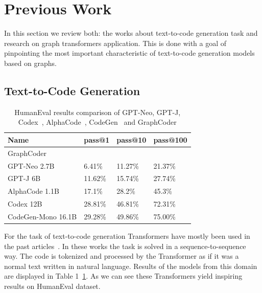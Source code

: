\documentclass[sigplan,screen,anonymous,natbib=false]{acmart}
\begin{document}
\section{Previous Work}\label{sec:previous-work}

In this section we review both: the works about text-to-code generation task and research on graph transformers application. 
This is done with a goal of pinpointing the most important characteristic of text-to-code generation models based on graphs.

\subsection{Text-to-Code Generation}\label{subsec:text-to-code-generation}

\begin{table}
    \centering
    \begin{tabular}{llll}
        \toprule
        \textbf{Name} & \textbf{pass@1} & \textbf{pass@10} & \textbf{pass@100} \\
        \midrule
        GraphCoder &  &  &  \\
        GPT-Neo 2.7B & 6.41\% & 11.27\% & 21.37\% \\
        GPT-J 6B & 11.62\% & 15.74\% & 27.74\% \\
        AlphaCode 1.1B & 17.1\% & 28.2\% & 45.3\% \\
        Codex 12B & 28.81\% & 46.81\% & 72.31\% \\
        CodeGen-Mono 16.1B & 29.28\% & 49.86\% & 75.00\% \\
        \bottomrule
    \end{tabular}
    \caption{HumanEval results comparison of GPT-Neo, GPT-J, Codex~\cite{chen_evaluating_2021}, AlphaCode~\cite{li_competition-level_nodate}, CodeGen~\cite{nijkamp_conversational_2022} and GraphCoder}
    \label{tab:human-eval-results}
\end{table}

For the task of text-to-code generation Transformers have mostly been used in the past articles~\cite{hendrycks_measuring_2021,chen_evaluating_2021,li_competition-level_nodate,nijkamp_conversational_2022}.
In these works the task is solved in a sequence-to-sequence way. 
The code is tokenized and processed by the Transformer as if it was a normal text written in natural language. 
Results of the models from this domain are displayed in Table 1~\ref{tab:human-eval-results}.
As we can see these Transformers yield inspiring results on HumanEval dataset.
\end{document}
